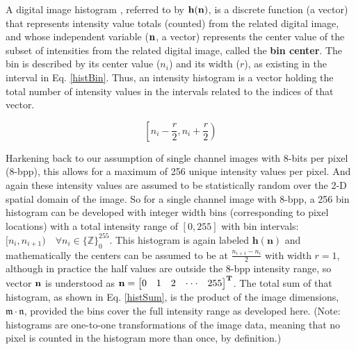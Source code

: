 %
%
%
%
%
%
%
%
%

%
%
%



A digital image histogram \cite{Gonzalez2008}, referred to by $\bf{h}(\bf{n})$, is a discrete function (a vector) that represents intensity value totals (counted) from the related digital image, and whose independent variable ($\bf{n}$, a vector) represents the center value of the subset of intensities from the related digital image, called the \textbf{bin center}. The bin is described by its center value ($n_{i}$) and its width ($r$), as existing in the interval in Eq. \ref{histBin}. Thus, an intensity histogram is a vector holding the total number of intensity values in the intervals related to the indices of that vector.

\begin{equation}
\label{histBin}
\left[n_{i}-\frac{r}{2},n_{i}+\frac{r}{2}\right)
\end{equation}

Harkening back to our assumption of single channel images with 8-bits per pixel (8-bpp), this allows for a maximum of 256 unique intensity values per pixel. And again these intensity values are assumed to be statistically random over the 2-D spatial domain of the image. So for a single channel image with 8-bpp, a 256 bin histogram can be developed with integer width bins (corresponding to pixel locations) with a total intensity range of $[0,255]$ with bin intervals: $[n_{i},n_{i+1}) \quad \forall n_{i} \in \{\mathbb{Z}\}_{0}^{255}$. This histogram is again labeled $\textbf{h}(\textbf{n})$ and mathematically the centers can be assumed to be at $\frac{n_{i+1}-n_{i}}{2}$ with width $r=1$, although in practice the half values are outside the 8-bpp intensity range, so vector $\bf{n}$ is understood as $\bf{n}=\begin{bmatrix}0&1&2&\cdot\cdot\cdot&255\end{bmatrix}^{T}$. The total sum of that histogram, as shown in Eq. \ref{histSum}, is the product of the image dimensions, $\mathfrak{m} \cdot \mathfrak{n}$, provided the bins cover the full intensity range as developed here. (Note: histograms are one-to-one transformations of the image data, meaning that no pixel is counted in the histogram more than once, by definition.)

